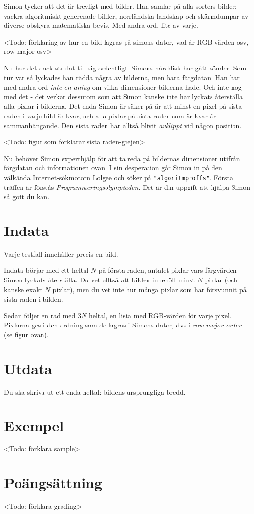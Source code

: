 
Simon tycker att det är trevligt med bilder. Han samlar på alla sorters bilder: vackra algoritmiskt genererade bilder, norrländska landskap och skärmdumpar av diverse obskyra matematiska bevis. Med andra ord, lite av varje.

<Todo: förklaring av hur en bild lagras på simons dator, vad är RGB-värden osv, row-major osv>

Nu har det dock strulat till sig ordentligt. Simons hårddisk har gått sönder. Som tur var så lyckades han rädda några av bilderna, men bara färgdatan. Han har med andra ord \emph{inte en aning} om vilka dimensioner bilderna hade. Och inte nog med det - det verkar dessutom som att Simon kanske inte har lyckats återställa alla pixlar i bilderna. Det enda Simon är säker på är att minst en pixel på sista raden i varje bild är kvar, och alla pixlar på sista raden som är kvar är sammanhängande. Den sista raden har alltså blivit \emph{avklippt} vid någon position.

<Todo: figur som förklarar sista raden-grejen>

Nu behöver Simon experthjälp för att ta reda på bildernas dimensioner utifrån färgdatan och informationen ovan. I sin desperation går Simon in på den välkända Internet-sökmotorn Lolgee och söker på \texttt{"algoritmproffs"}. Första träffen är förstås \emph{Programmeringsolympiaden}. Det är din uppgift att hjälpa Simon så gott du kan.

\section*{Indata}
Varje testfall innehåller precis en bild.

Indata börjar med ett heltal $N$ på första raden, antalet pixlar vars färgvärden Simon lyckats återställa. Du vet alltså att bilden innehöll minst $N$ pixlar (och kanske exakt $N$ pixlar), men du vet inte hur många pixlar som har försvunnit på sista raden i bilden.

Sedan följer en rad med $3N$ heltal, en lista med RGB-värden för varje pixel. Pixlarna ges i den ordning som de lagras i Simons dator, dvs i \emph{row-major order} (se figur ovan).

\section*{Utdata}
Du ska skriva ut ett enda heltal: bildens ursprungliga bredd.

\section*{Exempel}
<Todo: förklara sample>

\section*{Poängsättning}
<Todo: förklara grading>
